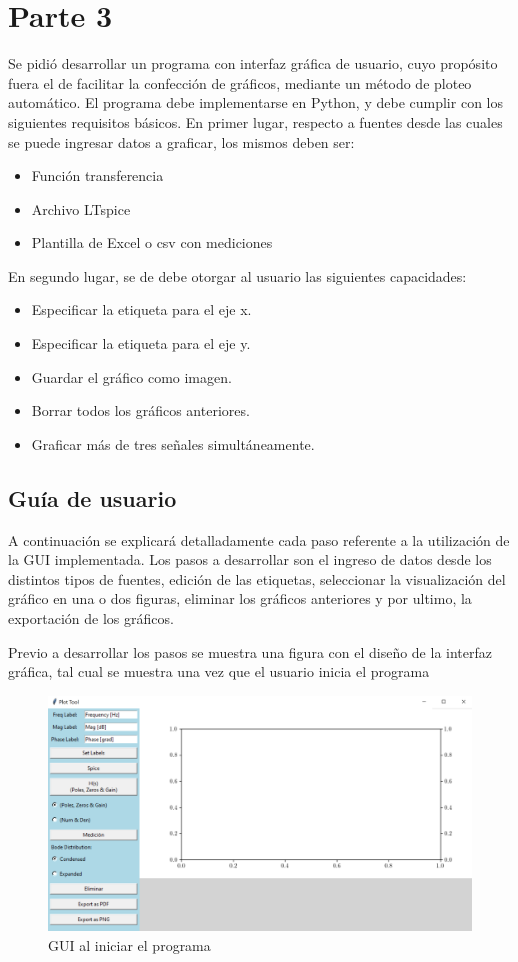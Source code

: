 
\section{Parte 3}
Se pidió desarrollar un programa con interfaz gráfica de usuario, cuyo propósito fuera el de facilitar la confección de gráficos, mediante un método de ploteo automático. El programa debe implementarse en Python, y debe cumplir con los siguientes requisitos básicos. 
En primer lugar, respecto a fuentes desde las cuales se puede ingresar datos a graficar, los mismos deben ser:
\begin{itemize}
\item Función transferencia
\item Archivo LTspice
\item Plantilla de Excel o csv con mediciones
\end{itemize}
En segundo lugar, se de debe otorgar al usuario las siguientes capacidades:
\begin{itemize}
\item Especificar la etiqueta para el eje x.
\item Especificar la etiqueta para el eje y.
\item Guardar el gráfico como imagen.
\item Borrar todos los gráficos anteriores.
\item Graficar más de tres señales simultáneamente.
\end{itemize}

\subsection{Guía de usuario}
A continuación se explicará detalladamente cada paso referente a la utilización de la GUI implementada. Los pasos a desarrollar son el ingreso de datos desde los distintos tipos de fuentes, edición de las etiquetas, seleccionar la visualización del gráfico en una o dos figuras, eliminar los gráficos anteriores y por ultimo, la exportación de los gráficos.

Previo a desarrollar los pasos se muestra una figura con el diseño de la interfaz gráfica, tal cual se muestra una vez que el usuario inicia el programa

\begin{figure}[ht]
\centering
\includegraphics[scale=0.2]{resources/window.png}
\caption{GUI al iniciar el programa}
\label{fig:window}
\end{figure}


